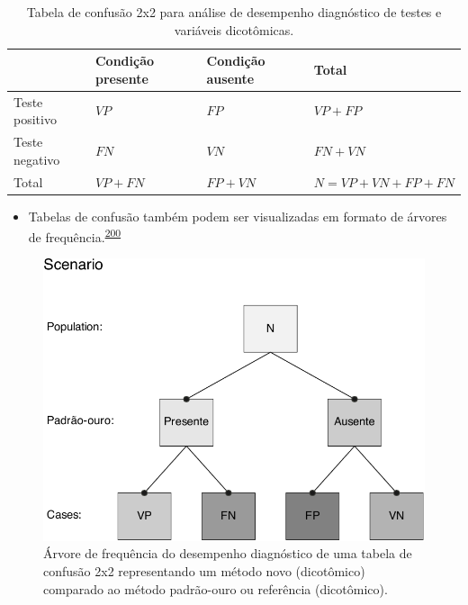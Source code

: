 \documentclass[
  a4paper,
]{book}
\providecommand{\tightlist}{%
  \setlength{\itemsep}{0pt}\setlength{\parskip}{0pt}}
\begin{document}
\begin{table}

\caption{\label{tab:crosstable}Tabela de confusão 2x2 para análise de desempenho diagnóstico de testes e variáveis dicotômicas.}
\centering
\begin{tabu} to 
\toprule
\textbf{ } & \textbf{Condição presente} & \textbf{Condição ausente} & \textbf{Total}\\
\midrule
Teste positivo & $VP$ & $FP$ & $VP+FP$\\
Teste negativo & $FN$ & $VN$ & $FN+VN$\\
Total & $VP+FN$ & $FP+VN$ & $N=VP+VN+FP+FN$\\
\bottomrule
\end{tabu}
\end{table}

\begin{itemize}
\tightlist
\item
  Tabelas de confusão também podem ser visualizadas em formato de árvores de frequência.\textsuperscript{\protect\hyperlink{ref-steckelberg2004}{200}}
\end{itemize}

\begin{figure}

{\centering \includegraphics{Ciencia-com-R_files/figure-latex/frequency-tree-1} 

}

\caption{Árvore de frequência do desempenho diagnóstico de uma tabela de confusão 2x2 representando um método novo (dicotômico) comparado ao método padrão-ouro ou referência (dicotômico).}\label{fig:frequency-tree}
\end{figure}
\end{document}
